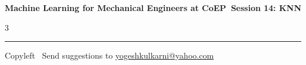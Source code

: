 \documentclass[8pt,landscape]{article}
\begin{document}
\footnotesize

\begin{center}
\Large{\textbf{Machine Learning for Mechanical Engineers at CoEP\ Session 14: KNN}}
\end{center}

\begin{multicols}{3}

\end{multicols}

\rule{\linewidth}{0.25pt}
\scriptsize
Copyleft \textcopyleft\  Send suggestions to
\href{http://www.yogeshkulkarni.com}{yogeshkulkarni@yahoo.com}
\end{document}
